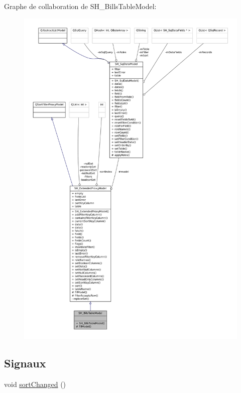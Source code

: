 Graphe de collaboration de S\-H\-\_\-\-Bills\-Table\-Model\-:
\nopagebreak
\begin{figure}[H]
\begin{center}
\leavevmode
\includegraphics[width=350pt]{classSH__BillsTableModel__coll__graph}
\end{center}
\end{figure}
\subsection*{Signaux}
\begin{DoxyCompactItemize}
\item 
void \hyperlink{classSH__ExtendedProxyModel_a573590c2763d06d07c6509d4c91a06b2}{sort\-Changed} ()
\end{DoxyCompactItemize}
